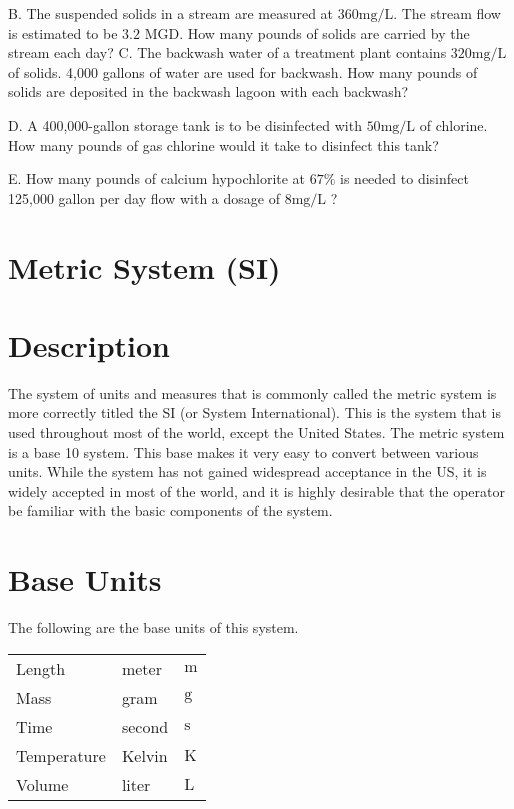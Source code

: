 B. The suspended solids in a stream are measured at $360 \mathrm{mg} / \mathrm{L}$. The stream flow is estimated to be $3.2$ MGD. How many pounds of solids are carried by the stream each day? C. The backwash water of a treatment plant contains $320 \mathrm{mg} / \mathrm{L}$ of solids. 4,000 gallons of water are used for backwash. How many pounds of solids are deposited in the backwash lagoon with each backwash?

D. A 400,000-gallon storage tank is to be disinfected with $50 \mathrm{mg} / \mathrm{L}$ of chlorine. How many pounds of gas chlorine would it take to disinfect this tank?

E. How many pounds of calcium hypochlorite at $67 \%$ is needed to disinfect 125,000 gallon per day flow with a dosage of $8 \mathrm{mg} / \mathrm{L}$ ?

\section{Metric System (SI)}
\section{Description}
The system of units and measures that is commonly called the metric system is more correctly titled the SI (or System International). This is the system that is used throughout most of the world, except the United States. The metric system is a base 10 system. This base makes it very easy to convert between various units. While the system has not gained widespread acceptance in the US, it is widely accepted in most of the world, and it is highly desirable that the operator be familiar with the basic components of the system.

\section{Base Units}
The following are the base units of this system.

\begin{tabular}{|l|l|l|}
\hline
Length & meter & $\mathrm{m}$ \\
Mass & gram & $\mathrm{g}$ \\
Time & second & $\mathrm{s}$ \\
Temperature & Kelvin & $\mathrm{K}$ \\
Volume & liter & $\mathrm{L}$ \\
\hline
\end{tabular}   \\

